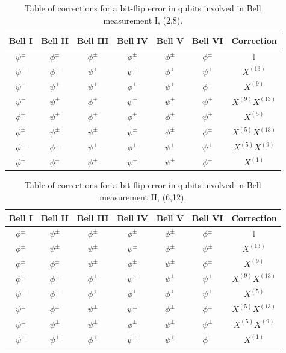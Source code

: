 \documentclass[10pt,a4paper]{book}
\numberwithin{equation}{chapter}
\numberwithin{figure}{chapter}
\numberwithin{table}{chapter}
\begin{document}
\begin{appendices}
\begin{table}[H]
    \centering
    \begin{tabular}{|c c c c c c|c|}
    \hline
   Bell I & Bell II & Bell III & Bell IV & Bell V & Bell VI & Correction \\
    \hline
  $\psi^{\pm}$&$\phi^{\pm}$&$\phi^{\pm}$&$\phi^{\pm}$&$\phi^{\pm}$&$\phi^{\pm}$&$\mathbb{I}$\\
 $\psi^{\pm}$&$\phi^{\pm}$&$\psi^{\pm}$&$\psi^{\pm}$&$\phi^{\pm}$&$\psi^{\pm}$&$X^{(13)}$\\
 $\psi^{\pm}$&$\psi^{\pm}$&$\psi^{\pm}$&$\phi^{\pm}$&$\psi^{\pm}$&$\phi^{\pm}$&$X^{(9)}$\\
 $\psi^{\pm}$&$\psi^{\pm}$&$\phi^{\pm}$&$\psi^{\pm}$&$\psi^{\pm}$&$\psi^{\pm}$&$X^{(9)}X^{(13)}$\\
 $\phi^{\pm}$&$\psi^{\pm}$&$\phi^{\pm}$&$\phi^{\pm}$&$\phi^{\pm}$&$\psi^{\pm}$&$X^{(5)}$\\
 $\phi^{\pm}$&$\psi^{\pm}$&$\psi^{\pm}$&$\psi^{\pm}$&$\phi^{\pm}$&$\phi^{\pm}$&$X^{(5)}X^{(13)}$\\
 $\phi^{\pm}$&$\phi^{\pm}$&$\psi^{\pm}$&$\phi^{\pm}$&$\psi^{\pm}$&$\psi^{\pm}$&$X^{(5)}X^{(9)}$\\
 $\phi^{\pm}$&$\phi^{\pm}$&$\phi^{\pm}$&$\psi^{\pm}$&$\psi^{\pm}$&$\phi^{\pm}$&$X^{(1)}$\\
   \hline
    \end{tabular}
	\caption{\footnotesize Table of corrections for a bit-flip error in qubits involved in Bell measurement I, (2,8).}
	\label{tab:GHZ4errorI}
\end{table} 

\begin{table}[H]
    \centering
    \begin{tabular}{|c c c c c c|c|}
    \hline
   Bell I & Bell II & Bell III & Bell IV & Bell V & Bell VI & Correction \\
    \hline
  $\phi^{\pm}$&$\psi^{\pm}$&$\phi^{\pm}$&$\phi^{\pm}$&$\phi^{\pm}$&$\phi^{\pm}$&$\mathbb{I}$\\
 $\phi^{\pm}$&$\psi^{\pm}$&$\psi^{\pm}$&$\psi^{\pm}$&$\phi^{\pm}$&$\psi^{\pm}$&$X^{(13)}$\\
 $\phi^{\pm}$&$\phi^{\pm}$&$\psi^{\pm}$&$\phi^{\pm}$&$\psi^{\pm}$&$\phi^{\pm}$&$X^{(9)}$\\
 $\phi^{\pm}$&$\phi^{\pm}$&$\phi^{\pm}$&$\psi^{\pm}$&$\psi^{\pm}$&$\psi^{\pm}$&$X^{(9)}X^{(13)}$\\
 $\psi^{\pm}$&$\phi^{\pm}$&$\phi^{\pm}$&$\phi^{\pm}$&$\phi^{\pm}$&$\psi^{\pm}$&$X^{(5)}$\\
 $\psi^{\pm}$&$\phi^{\pm}$&$\psi^{\pm}$&$\psi^{\pm}$&$\phi^{\pm}$&$\phi^{\pm}$&$X^{(5)}X^{(13)}$\\
 $\psi^{\pm}$&$\psi^{\pm}$&$\psi^{\pm}$&$\phi^{\pm}$&$\psi^{\pm}$&$\psi^{\pm}$&$X^{(5)}X^{(9)}$\\
 $\psi^{\pm}$&$\psi^{\pm}$&$\phi^{\pm}$&$\psi^{\pm}$&$\psi^{\pm}$&$\phi^{\pm}$&$X^{(1)}$\\
   \hline
    \end{tabular}
	\caption{\footnotesize Table of corrections for a bit-flip error in qubits involved in Bell measurement II, (6,12).}
	\label{tab:GHZ4errorII}
\end{table} 


\end{appendices}
\end{document}
